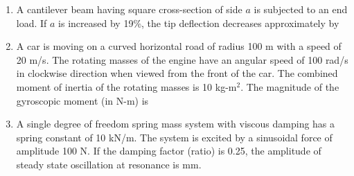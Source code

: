 \documentclass[journal,11pt,onecolumn]{IEEEtran}
\begin{document}
\begin{enumerate}
\begin{enumerate}

          \end{enumerate}

    \item A cantilever beam having square cross-section of side $a$ is subjected to an end load. If $a$ is increased by 19\%, the tip deflection decreases approximately by

          \begin{enumerate}


          \end{enumerate}

    \item A car is moving on a curved horizontal road of radius 100 m with a speed of 20 m/s. The rotating masses of the engine have an angular speed of 100 rad/s in clockwise direction when viewed from the front of the car. The combined moment of inertia of the rotating masses is 10 kg-m$^2$. The magnitude of the gyroscopic moment (in N-m) is \underline{\hspace{2cm}}

    \item A single degree of freedom spring mass system with viscous damping has a spring constant of 10 kN/m. The system is excited by a sinusoidal force of amplitude 100 N. If the damping factor (ratio) is 0.25, the amplitude of steady state oscillation at resonance is \underline{\hspace{2cm}} mm.


\end{enumerate}
\end{document}
